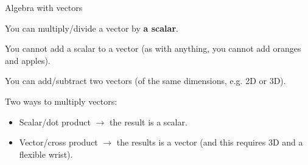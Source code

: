 \documentclass[aspectratio=169,
hyperref={colorlinks,urlcolor=blue}
]{beamer}
\begin{document}




\begin{bulletframe}{Algebra with vectors}
 \item You can multiply/divide a vector by \textbf{a scalar}.
 \item You cannot add a scalar to a vector (as with anything, you cannot add oranges and apples).
 \item You can add/subtract two vectors (of the same dimensions, e.g. 2D or 3D).
 \item Two ways to multiply vectors:
 \begin{itemize}
   \item Scalar/dot product $\rightarrow$ the result is a scalar.
 \item Vector/cross product $\rightarrow$ the results is a vector (and this requires 3D and a flexible wrist).
 \end{itemize}
\end{bulletframe}

\end{document}
